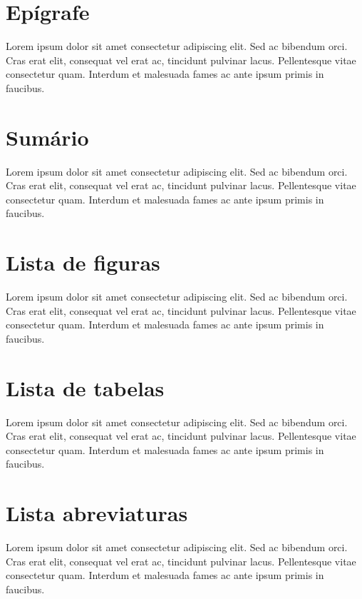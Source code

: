 \documentclass[11pt, a4paper]{report}
\begin{document}
\section*{Epígrafe}
\par Lorem ipsum dolor sit amet consectetur adipiscing elit. Sed ac bibendum orci. Cras erat elit, consequat vel erat ac, tincidunt pulvinar lacus. Pellentesque vitae consectetur quam. Interdum et malesuada fames ac ante ipsum primis in faucibus.
\clearpage

\section*{Sumário}
\par Lorem ipsum dolor sit amet consectetur adipiscing elit. Sed ac bibendum orci. Cras erat elit, consequat vel erat ac, tincidunt pulvinar lacus. Pellentesque vitae consectetur quam. Interdum et malesuada fames ac ante ipsum primis in faucibus.
\clearpage

\section*{Lista de figuras}
\par Lorem ipsum dolor sit amet consectetur adipiscing elit. Sed ac bibendum orci. Cras erat elit, consequat vel erat ac, tincidunt pulvinar lacus. Pellentesque vitae consectetur quam. Interdum et malesuada fames ac ante ipsum primis in faucibus.
\clearpage

\section*{Lista de tabelas}
\par Lorem ipsum dolor sit amet consectetur adipiscing elit. Sed ac bibendum orci. Cras erat elit, consequat vel erat ac, tincidunt pulvinar lacus. Pellentesque vitae consectetur quam. Interdum et malesuada fames ac ante ipsum primis in faucibus.
\clearpage

\section*{Lista abreviaturas}
\par Lorem ipsum dolor sit amet consectetur adipiscing elit. Sed ac bibendum orci. Cras erat elit, consequat vel erat ac, tincidunt pulvinar lacus. Pellentesque vitae consectetur quam. Interdum et malesuada fames ac ante ipsum primis in faucibus.
\clearpage
\end{document}
